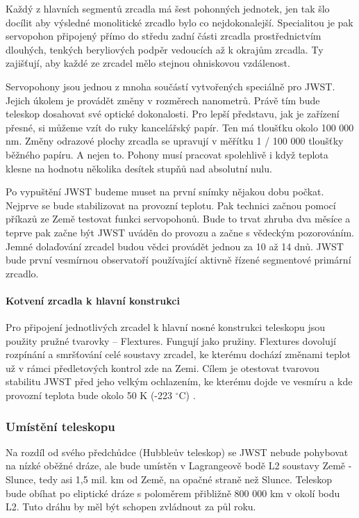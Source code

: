 \documentclass[a4paper,11pt]{article}
\begin{document}
Každý z hlavních segmentů zrcadla má šest pohonných jednotek, jen tak šlo docílit aby výsledné monolitické zrcadlo bylo co nejdokonalejší. Specialitou je pak servopohon připojený přímo do středu zadní části zrcadla prostřednictvím dlouhých, tenkých beryliových podpěr vedoucích až k okrajům zrcadla. Ty zajišťují, aby každé ze zrcadel mělo stejnou ohniskovou vzdálenost.


Servopohony jsou jednou z mnoha součástí vytvořených speciálně pro JWST. Jejich úkolem je provádět změny v rozměrech nanometrů. Právě tím bude teleskop dosahovat své optické dokonalosti. Pro lepší představu, jak je zařízení přesné, si můžeme vzít do ruky kancelářský papír. Ten má  tloušťku okolo  100 000 nm. Změny odrazové plochy zrcadla se upravují v měřítku  1 / 100 000 tloušťky běžného papíru. A nejen to. Pohony musí pracovat spolehlivě i když teplota klesne na hodnotu několika desítek stupňů nad absolutní nulu.

Po vypuštění JWST budeme muset na první snímky nějakou dobu počkat. Nejprve se bude  stabilizovat na provozní teplotu. Pak technici začnou pomocí příkazů ze Země testovat funkci servopohonů. Bude to trvat zhruba dva měsíce a teprve pak začne být JWST uváděn do provozu a začne s vědeckým pozorováním. Jemné dolaďování zrcadel budou vědci provádět jednou za 10 až 14 dnů. JWST bude první vesmírnou observatoří používající aktivně řízené segmentové primární zrcadlo.

\paragraph{Kotvení zrcadla k hlavní konstrukci}
Pro připojení jednotlivých zrcadel k hlavní nosné konstrukci teleskopu jsou použity pružné tvarovky – Flextures. Fungují jako pružiny. Flextures dovolují rozpínání a smršťování celé soustavy zrcadel, ke kterému dochází změnami teplot  už v rámci předletových kontrol zde na Zemi. Cílem je otestovat tvarovou stabilitu JWST před jeho velkým ochlazením, ke kterému dojde ve vesmíru a kde provozní teplota bude okolo 50 K (-223 $^\circ$C) \cite{osel}.

\subsubsection{Umístění teleskopu}
Na rozdíl od svého předchůdce (Hubbleův teleskop) se JWST nebude pohybovat na nízké oběžné dráze, ale bude umístěn v Lagrangeově bodě L2 soustavy Země - Slunce, tedy asi 1,5 mil. km od Země, na opačné straně než Slunce. Teleskop bude obíhat po eliptické dráze s poloměrem přibližně 800 000 km v okolí bodu L2. Tuto dráhu by měl být schopen zvládnout za půl roku.
\end{document}
